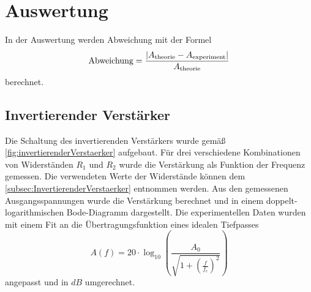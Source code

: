 \section{Auswertung}
\label{sec:Auswertung}




In der Auswertung werden Abweichung mit der Formel
\begin{equation}
    \text{Abweichung} = \frac{\lvert A_\text{theorie} - A_\text{experiment}\rvert}{A_\text{theorie}}
    \label{eq:Abweichung}
\end{equation}
berechnet. 

\subsection{Invertierender Verstärker}
\label{subsec:Auswertung_InvertierenderVerstaerker}

Die Schaltung des invertierenden Verstärkers wurde gemäß \autoref{fig:invertierenderVerstaerker} aufgebaut. 
Für drei verschiedene Kombinationen von Widerständen $R_1$ und $R_2$ wurde die Verstärkung als Funktion der Frequenz gemessen. 
Die verwendeten Werte der Widerstände können dem \autoref{subsec:InvertierenderVerstaerker} entnommen werden.
Aus den gemessenen Ausgangsspannungen wurde die Verstärkung berechnet und in einem doppelt-logarithmischen Bode-Diagramm dargestellt. 
Die experimentellen Daten wurden mit einem Fit an die Übertragungsfunktion eines idealen Tiefpasses
\begin{equation}
    A(f) = 20 \cdot \log_{10} \left( \frac{A_0}{\sqrt{1 + \left( \frac{f}{f_c} \right)^2}} \right)
    \label{eq:lowPassFilter}
\end{equation}
angepasst und in $\unit{dB}$ umgerechnet.

